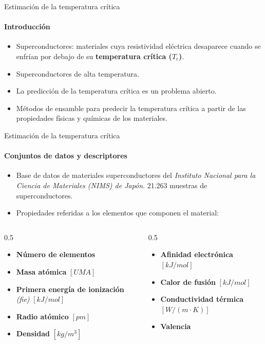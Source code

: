 \documentclass{beamer}
\begin{document}
\begin{frame}{\LARGE Estimación de la temperatura crítica}
    \framesubtitle{Introducción}
    \begin{itemize}
        \item Superconductores: materiales cuya resistividad eléctrica desaparece cuando se enfrían por debajo de su \textbf{temperatura crítica ($T_c$)}.
        \item Superconductores de alta temperatura.
        \item La predicción de la temperatura crítica es un problema abierto.
        \item Métodos de ensamble para predecir la temperatura crítica a partir de las propiedades físicas y químicas de los materiales.
    \end{itemize}
\end{frame}

\begin{frame}{\LARGE Estimación de la temperatura crítica}
    \framesubtitle{Conjuntos de datos y descriptores}
    \begin{itemize}
        \item Base de datos de materiales superconductores del \textit{Instituto Nacional para la Ciencia de Materiales (NIMS) de Japón}. 21.263 muestras de superconductores.
        \item Propiedades referidas a los elementos que componen el material:
    \end{itemize}
    \begin{columns}[T]
            \begin{column}{0.5\textwidth}
                \begin{itemize}
                    \item \textbf{Número de elementos}
                    \item \textbf{Masa atómica} $[UMA]$
                    \item \textbf{Primera energía de ionización} \textit{(fie)} $[kJ/mol]$
                    \item \textbf{Radio atómico} $[pm]$
                    \item \textbf{Densidad} $[kg/m^3]$
                \end{itemize}
            \end{column}

            \begin{column}{0.5\textwidth}
                \begin{itemize}
                    \item \textbf{Afinidad electrónica} $[kJ/mol]$
                    \item \textbf{Calor de fusión} $[kJ/mol]$
                    \item \textbf{Conductividad térmica} $[W/(m \cdot K)]$
                    \item \textbf{Valencia}
                \end{itemize}
            \end{column}
        \end{columns}
\end{frame}
\end{document}
